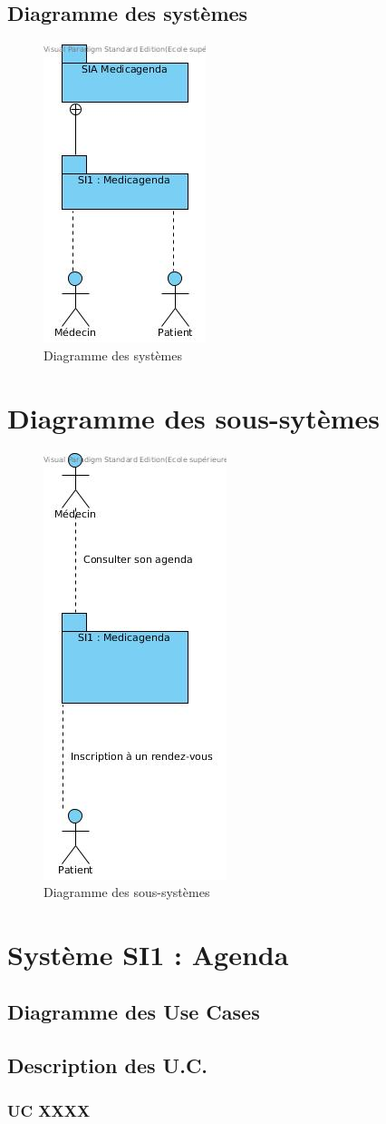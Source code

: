 \documentclass[a4paper, 11pt]{report}
\begin{document}
\subsection{Diagramme des systèmes}
\begin{figure}[hb]
	\centering
	\includegraphics[scale=0.7]{systemes.jpg}
	\caption{Diagramme des systèmes}
	\label{fig:systemes}
\end{figure}
\newpage
\section{Diagramme des sous-sytèmes}
\begin{figure}[hb]
	\centering
	\includegraphics[scale=0.7]{sous-systeme.jpg}
	\caption{Diagramme des sous-systèmes}
	\label{fig:sous-systeme}
\end{figure}
\section{Système SI1 : Agenda}
\subsection{Diagramme des Use Cases}
\subsection{Description des U.C.}
\subsubsection{UC XXXX}
\end{document}
